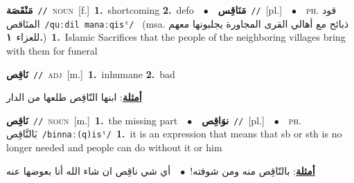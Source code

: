 \documentclass[10pt,a4paper,twoside]{article} %
\begin{document}
\begin{multicols}{2}
{\setlength\topsep{0pt}\textbf{\foreignlanguage{arabic}{مَنْقَصَة}}\ {\color{gray}\texttt{//}\color{black}}\ \textsc{noun}\ [f.]\ \textbf{1.}~shortcoming  \textbf{2.}~defo\ \ $\bullet$\ \ \setlength\topsep{0pt}\textbf{\foreignlanguage{arabic}{مَنَاقِس}}\ {\color{gray}\texttt{//}\color{black}}\ [pl.]\ \ $\bullet$\ \ \textsc{ph.} \color{gray} \foreignlanguage{arabic}{قود المنَاقص}\color{black}\ {\color{gray}\texttt{/{\sffamily quːdil manaːqisˤ}/}\color{black}}\ \color{gray} (msa. \foreignlanguage{arabic}{ذبائح مع أهالي القرى المجاورة يجلبونها معهم للعزاء}~\foreignlanguage{arabic}{\textbf{١.}})\color{black}\ \textbf{1.}~Islamic Sacrifices that the people of the neighboring villages bring with them for funeral\ } \vspace{2mm}

{\setlength\topsep{0pt}\textbf{\foreignlanguage{arabic}{نَاقِص}}\ {\color{gray}\texttt{//}\color{black}}\ \textsc{adj}\ [m.]\ \textbf{1.}~inhumane  \textbf{2.}~bad\  \begin{flushright}\color{gray}\foreignlanguage{arabic}{\textbf{\underline{\foreignlanguage{arabic}{أمثلة}}}: ابنها النّاقِص طلعها من الدار}\end{flushright}\color{black}} \vspace{2mm}

{\setlength\topsep{0pt}\textbf{\foreignlanguage{arabic}{نَاقِص}}\ {\color{gray}\texttt{//}\color{black}}\ \textsc{noun}\ [m.]\ \textbf{1.}~the missing part\ \ $\bullet$\ \ \setlength\topsep{0pt}\textbf{\foreignlanguage{arabic}{نوَاقِص}}\ {\color{gray}\texttt{//}\color{black}}\ [pl.]\ \ $\bullet$\ \ \textsc{ph.} \color{gray} \foreignlanguage{arabic}{بَالنَّاقِص}\color{black}\ {\color{gray}\texttt{/{\sffamily binnaː(q)isˤ}/}\color{black}}\ \textbf{1.}~it is an expression that means that sb or sth is no longer needed and people can do without it or him\  \begin{flushright}\color{gray}\foreignlanguage{arabic}{\textbf{\underline{\foreignlanguage{arabic}{أمثلة}}}: بالنّاقِص منه ومن شوفته!\ $\bullet$\ \  أي شي ناقِص ان شاء الله أنا بعوضها عنه}\end{flushright}\color{black}} \vspace{2mm}


\end{multicols}
\end{document}
